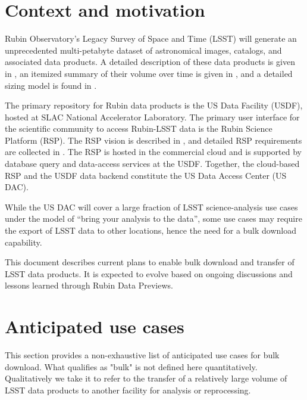 \section{Context and motivation}

Rubin Observatory's Legacy Survey of Space and Time (LSST) will generate an unprecedented multi-petabyte dataset of astronomical images, catalogs, and associated data products. A detailed description of these data products is given in , an itemized summary of their volume over time is given in , and a detailed sizing model is found in .

The primary repository for Rubin data products is the US Data Facility (USDF), hosted at SLAC National Accelerator Laboratory. The primary user interface for the scientific community to access Rubin-LSST data is the Rubin Science Platform (RSP). The RSP vision is described in , and detailed RSP requirements are collected in . The RSP is hosted in the commercial cloud and is supported by database query and data-access services at the USDF. Together, the cloud-based RSP and the USDF data backend constitute the US Data Access Center (US DAC).

While the US DAC will cover a large fraction of LSST science-analysis use cases under the model of ``bring your analysis to the data'', some use cases may require the export of LSST data to other locations, hence the need for a bulk download capability.

This document describes current plans to enable bulk download and transfer of LSST data products. It is expected to evolve based on ongoing discussions and lessons learned through Rubin Data Previews.

\section{Anticipated use cases}

This section provides a non-exhaustive list of anticipated use cases for bulk download. What qualifies as "bulk" is not defined here quantitatively. Qualitatively we take it to refer to the transfer of a relatively large volume of LSST data products to another facility for analysis or reprocessing.

